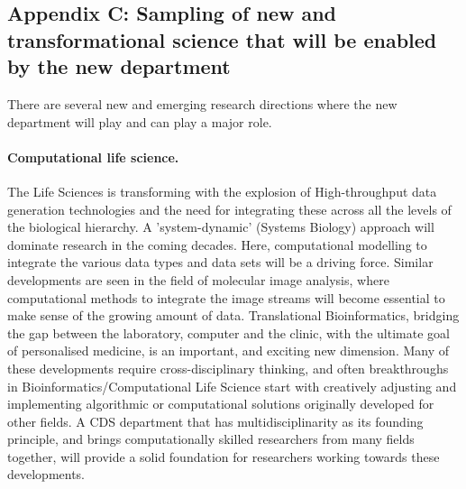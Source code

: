 \documentclass[%
oneside,                 %
final,                   %
10pt]{article}
\begin{document}
\subsection*{Appendix C:  Sampling of new and transformational science that will  be enabled by the new department}

There are several new and emerging research directions where the new department will play and can play a major role. 


\paragraph{Computational life science.}
The Life Sciences is transforming with the explosion of
High-throughput data generation technologies and the need for
integrating these across all the levels of the biological hierarchy. A
'system-dynamic' (Systems Biology) approach will dominate research in
the coming decades. Here, computational modelling to integrate the
various data types and data sets will be a driving force. Similar
developments are seen in the field of molecular image analysis, where
computational methods to integrate the image streams will become
essential to make sense of the growing amount of data. Translational
Bioinformatics, bridging the gap between the laboratory, computer and
the clinic, with the ultimate goal of personalised medicine, is an
important, and exciting new dimension. Many of these developments
require cross-disciplinary thinking, and often breakthroughs in
Bioinformatics/Computational Life Science start with creatively
adjusting and implementing algorithmic or computational solutions
originally developed for other fields. A CDS department that has
multidisciplinarity as its founding principle, and brings
computationally skilled researchers from many fields together, will
provide a solid foundation for researchers working towards these
developments.
\end{document}
